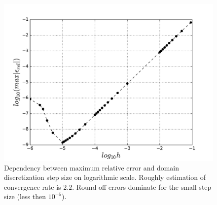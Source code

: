 \documentclass[10pt]{article}
\begin{document}
\begin{figure}
  \begin{center}
    \includegraphics[scale=0.7]{relative_error_log}
    \caption{Dependency between maximum relative error and domain discretization step size on logarithmic scale. Roughly estimation of convergence rate is $2.2$. Round-off errors dominate for the small step size (less then $10^{-5}$).}
    \label{fig:error}
  \end{center}
\end{figure}
\end{document}
